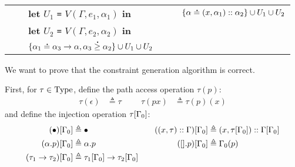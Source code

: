 {\begin{tabular}{@{\hskip0pt}r@{\hskip2pt}c@{\hskip2pt}l@{\hskip1pt}r@{\hskip2pt}c@{\hskip2pt}l}
                                     &              & \textbf{let} $U_1$ \texttt{=} $V(\Gamma,e_1,\alpha_1)$ \textbf{in}                   &                                    &              & $\{\alpha\overset{\,_{\mbox{\Large .}}}{=}(x,\alpha_1)::\alpha_2\}\cup U_1\cup U_2$                          \\
                                     &              & \textbf{let} $U_2$ \texttt{=} $V(\Gamma,e_2,\alpha_2)$ \textbf{in}                   &                                    &              &                                                                                     \\
                                     &              & $\{\alpha_1\overset{\,_{\mbox{\Large .}}}{=}\alpha_3\rightarrow\alpha,\alpha_3\overset{\,_{\mbox{\Large .}}}{\ge}\alpha_2\}\cup U_1\cup U_2$ &                                    &              &                                                                                     \\
    \end{tabular}
  }

\vphantom{}

We want to prove that the constraint generation algorithm is correct.

First, for $\tau\in\text{Type}$, define the path access operation $\tau(p)$:
\begin{align*}
  \tau(\epsilon) & \triangleq\tau &  &  & \tau(px) & \triangleq\tau(p)(x)
\end{align*}
and define the injection operation $\tau[\Gamma_0]$:
\begin{align*}
  (\bullet)[\Gamma_0]                 & \triangleq\bullet                                       &  &  & ((x,\tau)::\Gamma)[\Gamma_0] & \triangleq(x,\tau[\Gamma_0])::\Gamma[\Gamma_0] \\
  (\alpha.p)[\Gamma_0]                & \triangleq\alpha.p                                      &  &  & ([].p)[\Gamma_0]                & \triangleq\Gamma_0(p)                              \\
  (\tau_1\rightarrow\tau_2)[\Gamma_0] & \triangleq\tau_1[\Gamma_0]\rightarrow\tau_2[\Gamma_0]
\end{align*}

